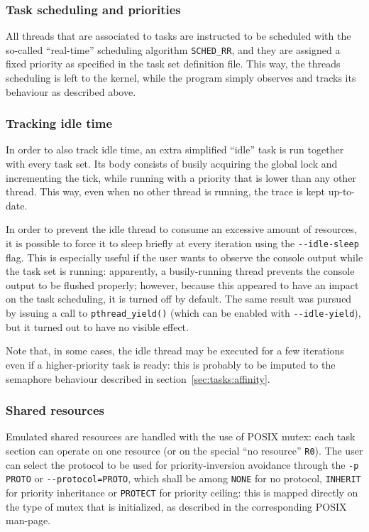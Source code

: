 \documentclass[paper=a4, fontsize=11pt]{scrartcl}
\newcommand{\mono}[1]{\texttt{#1}}
\numberwithin{equation}{section}        %
\numberwithin{figure}{section}          %
\numberwithin{table}{section}               %
\numberwithin{fragment}{section}
\begin{document}
\subsubsection{Task scheduling and priorities}\label{sec:tasks:prio}
All threads that are associated to tasks are instructed to be scheduled with the so-called ``real-time'' scheduling algorithm \mono{SCHED\_RR}\cite{man-sched}, and they are assigned a fixed priority as specified in the task set definition file. This way, the threads scheduling is left to the kernel, while the program simply observes and tracks its behaviour as described above.


\subsubsection{Tracking idle time}\label{sec:tasks:idle}
In order to also track idle time, an extra simplified ``idle'' task is run together with every task set. Its body consists of busily acquiring the global lock and incrementing the tick, while running with a priority that is lower than any other thread. This way, even when no other thread is running, the trace is kept up-to-date.

In order to prevent the idle thread to consume an excessive amount of resources, it is possible to force it to sleep briefly at every iteration using the \mono{-{}-idle-sleep} flag. This is especially useful if the user wants to observe the console output while the task set is running: apparently, a busily-running thread prevents the console output to be flushed properly; however, because this appeared to have an impact on the task scheduling, it is turned off by default. The same result was pursued by issuing a call to \mono{pthread\_yield()} (which can be enabled with \mono{-{}-idle-yield}), but it turned out to have no visible effect.

Note that, in some cases, the idle thread may be executed for a few iterations even if a higher-priority task is ready: this is probably to be imputed to the semaphore behaviour described in section~\ref{sec:tasks:affinity}.

\subsubsection{Shared resources}\label{sec:tasks:resources}
Emulated shared resources are handled with the use of POSIX mutex: each task section can operate on one resource (or on the special ``no resource'' \mono{R0}).
The user can select the protocol to be used for priority-inversion avoidance through the \mono{-p PROTO} or \mono{-{}-protocol=PROTO}, which shall be among \mono{NONE} for no protocol, \mono{INHERIT} for priority inheritance or \mono{PROTECT} for priority ceiling: this is mapped directly on the type of mutex that is initialized, as described in the corresponding POSIX man-page\cite{man-mutexproto}.
\end{document}
